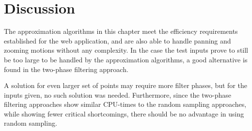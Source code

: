 

\section{Discussion}
The approximation algorithms in this chapter meet the efficiency requirements established for the web application, and are also able to handle panning and zooming motions without any complexity. In the case the test inputs prove to still be too large to be handled by the approximation algorithms, a good alternative is found in the two-phase filtering approach.

A solution for even larger set of points may require more filter phases, but for the inputs given, no such solution was needed. Furthermore, since the two-phase filtering approaches show similar CPU-times to the random sampling approaches, while showing fewer critical shortcomings, there should be no advantage in using random sampling.